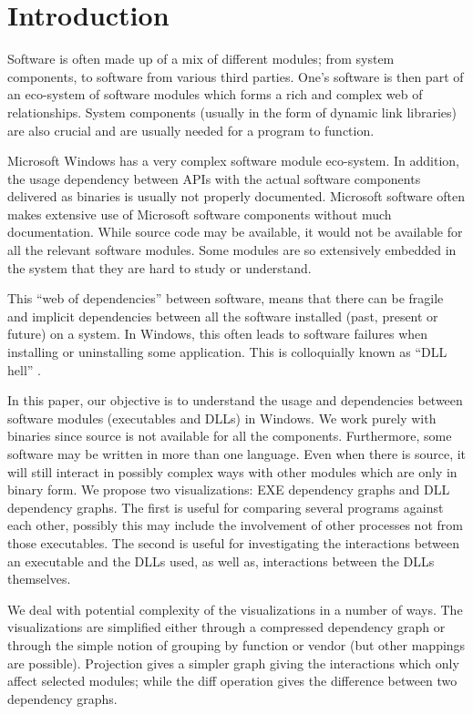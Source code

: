 \section{Introduction}



Software is often made up of
a mix of different modules; from system components, to
software from various third parties.
One's software is then part of an eco-system of software modules
which forms a rich and complex web of relationships.
System components (usually in the form of dynamic link libraries)
are also crucial and are usually needed for
a program to function.


Microsoft Windows has a very complex software module eco-system.
In addition, the usage dependency between
APIs with the actual software components delivered as binaries
is usually not properly documented.
Microsoft software often makes extensive
use of Microsoft software components without much documentation.
While source code may be available, it would not be available for all
the relevant software modules.
Some modules are so extensively embedded in the system that they are
hard to study or understand.

This ``web of dependencies'' between software,
means that
there can be fragile and implicit dependencies between all the software
installed (past, present or future) on a system.
In Windows, this often leads to software failures when installing or
uninstalling some application.
This is colloquially known as ``DLL hell'' \cite{dllhell}.

In this paper, our objective is to understand the usage and dependencies
between software modules (executables and DLLs) in Windows.
We work purely with binaries since source is not available for all the
components. Furthermore, some software may be written in more than
one language.
Even when there is source, it will still interact in possibly complex
ways with other modules which are only in binary form.
We propose two visualizations: EXE dependency graphs and DLL dependency
graphs. The first is useful for comparing several programs
against each other, possibly this may include the involvement
of other processes not from those executables.
The second is useful for investigating the interactions between
an executable and the DLLs used, as well as, interactions
between the DLLs themselves.

We deal with potential complexity of the visualizations in a number of ways.
The visualizations are
simplified either through a compressed dependency graph
or through the simple notion of grouping by function
or vendor (but other mappings are possible).
Projection gives a simpler graph giving the interactions which
only affect selected modules; while the diff operation
gives the difference between two dependency graphs.

